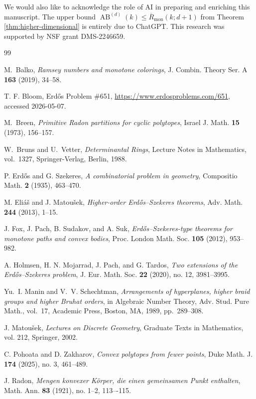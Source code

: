\documentclass[11pt]{article}
\begin{document}
We would also like to acknowledge the role of AI in preparing and enriching this manuscript. The upper bound $\operatorname{AB}^{(d)}(k)
\le \overline R_{\mathrm{mon}}(k;d+1)$ from Theorem \ref{thm:higher-dimensional} is entirely due to ChatGPT. This research was supported by NSF grant DMS-2246659.

\begin{thebibliography}{99}

 M.~Balko, {\em Ramsey numbers and monotone colorings},  J. Combin. Theory Ser. A {\bf 163} (2019), 34--58.

T. F. Bloom, Erd\H{o}s Problem \#651, \url{https://www.erdosproblems.com/651}, accessed 2026-05-07.

M.~Breen,
\emph{Primitive Radon partitions for cyclic polytopes},
Israel J. Math. \textbf{15} (1973), 156--157.

W.~Bruns and U.~Vetter, \emph{Determinantal Rings}, Lecture Notes in Mathematics, vol.~1327, Springer-Verlag, Berlin, 1988.

P. Erd\H{o}s and G. Szekeres,
\emph{A combinatorial problem in geometry},
Compositio Math. \textbf{2} (1935), 463--470.

M. Eli\'a\v{s} and J. Matou\v{s}ek,
\emph{Higher-order Erd\H{o}s--Szekeres theorems},
Adv. Math. \textbf{244} (2013), 1--15.

J. Fox, J. Pach, B. Sudakov, and A. Suk,
\emph{Erd\H{o}s--Szekeres-type theorems for monotone paths and convex bodies},
Proc. London Math. Soc. \textbf{105} (2012), 953--982.

A. Holmsen, H. N. Mojarrad, J. Pach, and G. Tardos,
\emph{Two extensions of the Erd\H{o}s--Szekeres problem},
J. Eur. Math. Soc. \textbf{22} (2020), no. 12, 3981--3995.

Yu.~I. Manin and V.~V. Schechtman, \emph{Arrangements of hyperplanes, higher braid groups and higher Bruhat orders}, in Algebraic Number Theory, Adv. Stud. Pure Math., vol.~17, Academic Press, Boston, MA, 1989, pp.~289--308.

J. Matou\v{s}ek,
\emph{Lectures on Discrete Geometry},
Graduate Texts in Mathematics, vol. 212, Springer, 2002.

C. Pohoata and D. Zakharov,
\emph{Convex polytopes from fewer points},
Duke Math. J. \textbf{174} (2025), no. 3, 461--489.

J. Radon, \emph{Mengen konvexer K\"orper, die einen gemeinsamen Punkt enthalten}, Math. Ann. \textbf{83} (1921), no. 1--2, 113–-115.


\end{thebibliography}
\end{document}
